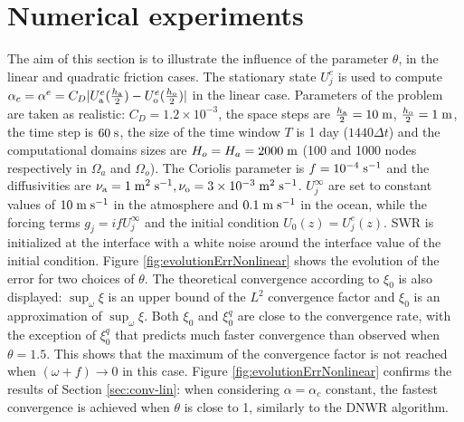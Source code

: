 \section{Numerical experiments}
\label{sec:num-exp}
The aim of this section is to illustrate the influence of the parameter $\theta$, in the linear and quadratic friction cases. 
The stationary state $U_j^e$ is used to compute $\alpha_c = \alpha^e = C_D|U_{\rm a}^e(\frac{h_{\rm a}}{2}) - U_{\rm o}^e (\frac{h_{\rm o}}{2})|$ in the linear case.
Parameters of the problem are taken as realistic: $C_D = 1.2\times 10^{-3}$, the space steps are $\frac{h_{\rm a}}{2} = 10\; {\rm m}$, $\frac{h_{\rm o}}{2} = 1 \;{\rm m}$,
the time step  is $60 \;{\rm s}$,
the size of the time window $T$ is 1 day ($1440\Delta t$) and the computational domains sizes are $H_o = H_a = 2000 \; {\rm m}$
(100 and 1000 nodes respectively in $\Omega_a$ and $\Omega_o$).
The Coriolis parameter is 
$f=10^{-4}\; {\rm s^{-1}}$ and the diffusivities are 
$\nu_{\rm a} = 1\; {\rm m^2}\;{\rm s}^{-1}, 
\nu_{\rm o} = 3\times 10^{-3} \;{\rm m^2}\;{\rm s}^{-1}$. 
 $U_j^\infty$
are  set to constant values of $10\;{\rm m}\;{\rm s}^{-1}$ in the 
atmosphere and $0.1\;{\rm m}\;{\rm s}^{-1}$ in the ocean, while the forcing terms 
$g_j=i f U^\infty_j$ and the initial condition $U_0(z)=U_j^e(z)$.
SWR is 
initialized at the interface with a white noise around the interface value
of the initial condition.
Figure \ref{fig:evolutionErrNonlinear} shows the evolution of the error for two choices of $\theta$. The theoretical
convergence according to $\xi_0$ is
also displayed: $\sup_\omega \xi$ is an upper bound of the $L^2$ convergence factor \cite{thery_etude_2021} and $\xi_0$ is an approximation of $\sup_\omega \xi$.
Both $\xi_0$ and $\xi_0^q$ are close to the convergence rate, with the exception of
$\xi_0^q$ that predicts much faster convergence than observed when $\theta=1.5$. This shows that the maximum of the convergence factor is not reached when $(\omega+f) \rightarrow 0$ in this case. Figure \ref{fig:evolutionErrNonlinear} confirms the results of Section \ref{sec:conv-lin}:
when considering $\alpha=\alpha_c$ constant, the fastest convergence is achieved when $\theta$ is close to 1, similarly to the DNWR algorithm.
